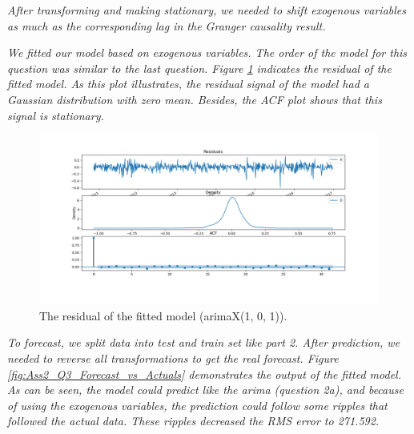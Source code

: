\textit{After transforming and making stationary, we needed to shift exogenous variables as much as the corresponding lag in the Granger causality result.}

\textit{We fitted our model based on exogenous variables. The order of the model for this question was similar to the last question. Figure \ref{fig:Ass2_Q3_residual_plot} indicates the residual of the fitted model. As this plot illustrates, the residual signal of the model had a Gaussian distribution with zero mean. Besides, the \gls{ACF} plot shows that this signal is stationary.}



\begin{figure}[H]
    \centering
    \begin{minipage}[b]{1\textwidth}
        \includegraphics[width=\textwidth]{manuscript/src/figures/Ass2/Ass2_Q3_residual_plot.png}
    \end{minipage}
    \caption{The residual of the fitted model (\gls{arima}X(1, 0, 1)).}
    \label{fig:Ass2_Q3_residual_plot}
\end{figure}

\textit{To forecast, we split data into test and train set like part 2. After prediction, we needed to reverse all transformations to get the real forecast. Figure \ref{fig:Ass2_Q3_Forecast_vs_Actuals} demonstrates the output of the fitted model. As can be seen, the model could predict like the \gls{arima} (question 2a), and because of using the exogenous variables, the prediction could follow  some ripples that followed the actual data. These ripples decreased the RMS error to 271.592.} 

